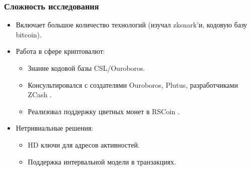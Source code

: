 \documentclass[11pt,handout,pdf,hyperref={unicode}]{beamer}
\newcommand{\backupend}{
   \setcounter{framenumber}{\value{finalframe}}
}
\begin{document}
\begin{frame}
  \frametitle{Сложность исследования}

  \begin{itemize}
  \item Включает большое количество технологий (изучал zksnark'и,
    кодовую базу bitcoin).
  \item Работа в сфере криптовалют:
    \begin{itemize}
    \item Знание кодовой базы CSL/Ouroboros.
    \item Консультировался с создателями Ouroboros,
      Plutus\parencite{plutus}, разработчиками ZCash
      \parencite{zerocash}.
    \item Реализовал поддержку цветных монет в RSCoin
      \parencite{rscoin}.
    \end{itemize}
  \item Нетривиальные решения:
    \begin{itemize}
    \item HD ключи для адресов активностей.
    \item Поддержка интервальной модели в транзакциях.
    \end{itemize}
  \end{itemize}
\end{frame}

\backupend
\end{document}
